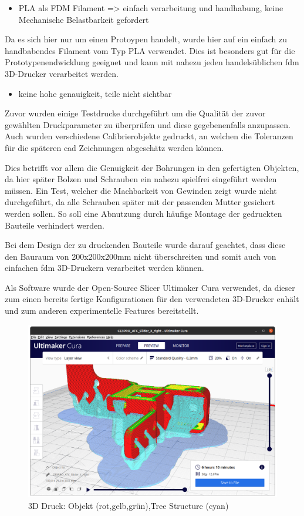\begin{itemize}
\tightlist
\item
  PLA als FDM Filament =\textgreater{} einfach verarbeitung und
  handhabung, keine Mechanische Belastbarkeit gefordert
\end{itemize}

Da es sich hier nur um einen Protoypen handelt, wurde hier auf ein
einfach zu handbabendes Filament vom Typ PLA verwendet. Dies ist
besonders gut für die Prototypenendwicklung geeignet und kann mit nahezu
jeden handelsüblichen \gls{fdm} 3D-Drucker verarbeitet werden.

\begin{itemize}
\tightlist
\item
  keine hohe genauigkeit, teile nicht sichtbar
\end{itemize}

Zuvor wurden einige Testdrucke durchgeführt um die Qualität der zuvor
gewählten Druckparameter zu überprüfen und diese gegebenenfalls
anzupassen. Auch wurden verschiedene Calibrierobjekte gedruckt, an
welchen die Toleranzen für die späteren \gls{cad} Zeichnungen abgeschätz
werden können.

Dies betrifft vor allem die Genuigkeit der Bohrungen in den gefertigten
Objekten, da hier später Bolzen und Schrauben ein nahezu spielfrei
eingeführt werden müssen. Ein Test, welcher die Machbarkeit von Gewinden
zeigt wurde nicht durchgeführt, da alle Schrauben später mit der
passenden Mutter gesichert werden sollen. So soll eine Abnutzung durch
häufige Montage der gedruckten Bauteile verhindert werden.

Bei dem Design der zu druckenden Bauteile wurde darauf geachtet, dass
diese den Bauraum von 200x200x200mm nicht überschreiten und somit auch
von einfachen \gls{fdm} 3D-Druckern verarbeitet werden können.

Als Software wurde der Open-Source Slicer Ultimaker Cura
\cite{ultimakercura} verwendet, da dieser zum einen bereits fertige
Konfigurationen für den verwendeten 3D-Drucker enhält und zum anderen
experimentelle Features bereitstellt.

\begin{figure}
\centering
\includegraphics{images/3d_print_tree_structure.png}
\caption{3D Druck: Objekt (rot,gelb,grün),Tree Structure (cyan)}
\end{figure}

